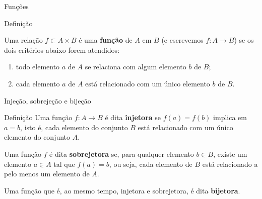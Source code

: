 \begin{frame}[fragile]{Funções}

    \begin{block}{Definição}

        Uma relação $f\subset A\times B$ é uma \textbf{função} de $A$ em $B$ (e escrevemos $f: A \to B$) se os dois critérios abaixo forem atendidos:

        \vspace{0.1in}

        \begin{enumerate}
            \item todo elemento $a$ de $A$ se relaciona com algum elemento $b$ de $B$;
            \item cada elemento $a$ de $A$ está relacionado com um único elemento $b$ de $B$.
        \end{enumerate}
    \end{block}

\end{frame}

\begin{frame}[fragile]{Injeção, sobrejeção e bijeção}

    \begin{block}{Definição}
        Uma função $f: A\to B$ é dita \textbf{injetora} se $f(a) = f(b)$ implica em $a = b$, isto é, cada elemento do conjunto $B$ está relacionado com um único elemento do conjunto $A$.

        \vspace{0.1in}

        Uma função $f$ é dita \textbf{sobrejetora} se, para qualquer elemento $b \in B$, existe um elemento $a \in A$ tal que $f(a) = b$, ou seja, cada elemento de $B$ está relacionado a pelo menos um elemento de $A$.

        \vspace{0.1in}

        Uma função que é, ao mesmo tempo, injetora e sobrejetora, é dita \textbf{bijetora}.
    \end{block}

\end{frame}

